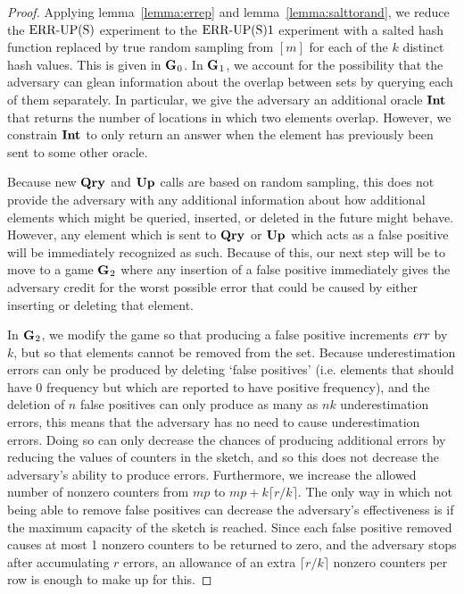 \begin{proof}

Applying lemma~\ref{lemma:errep} and lemma~\ref{lemma:salttorand}, we reduce the $\textnormal{ERR\mbox{-}UP(S)}$ experiment to the $\textnormal{ERR\mbox{-}UP(S)}1$ experiment with a salted hash function replaced by true random sampling from $[m]$ for each of the $k$ distinct hash values. This is given in $\mathbf{G}\hspace{0.5pt}_0$. In $\mathbf{G}\hspace{0.5pt}_1$, we account for the possibility that the adversary can glean information about the overlap between sets by querying each of them separately. In particular, we give the adversary an additional oracle $\mathbf{Int}\hspace{0.5pt}$ that returns the number of locations in which two elements overlap. However, we constrain $\mathbf{Int}\hspace{0.5pt}$ to only return an answer when the element has previously been sent to some other oracle.

Because new $\mathbf{Qry}\hspace{0.5pt}$ and $\mathbf{Up}\hspace{0.5pt}$ calls are based on random sampling, this does not provide the adversary with any additional information about how additional elements which might be queried, inserted, or deleted in the future might behave. However, any element which is sent to $\mathbf{Qry}\hspace{0.5pt}$ or $\mathbf{Up}\hspace{0.5pt}$ which acts as a false positive will be immediately recognized as such. Because of this, our next step will be to move to a game $\mathbf{G}\hspace{0.5pt}_2$ where any insertion of a false positive immediately gives the adversary credit for the worst possible error that could be caused by either inserting or deleting that element.


In $\mathbf{G}\hspace{0.5pt}_2$, we modify the game so that producing a false positive increments $\textit{err}$ by $k$, but so that elements cannot be removed from the set. Because underestimation errors can only be produced by deleting `false positives' (i.e. elements that should have 0 frequency but which are reported to have positive frequency), and the deletion of $n$ false positives can only produce as many as $nk$ underestimation errors, this means that the adversary has no need to cause underestimation errors. Doing so can only decrease the chances of producing additional errors by reducing the values of counters in the sketch, and so this does not decrease the adversary's ability to produce errors. Furthermore, we increase the allowed number of nonzero counters from $mp$ to $mp + k\lceil r/k \rceil$. The only way in which not being able to remove false positives can decrease the adversary's effectiveness is if the maximum capacity of the sketch is reached. Since each false positive removed causes at most 1 nonzero counters to be returned to zero, and the adversary stops after accumulating $r$ errors, an allowance of an extra $\lceil r/k \rceil$ nonzero counters per row is enough to make up for this.


\end{proof}
